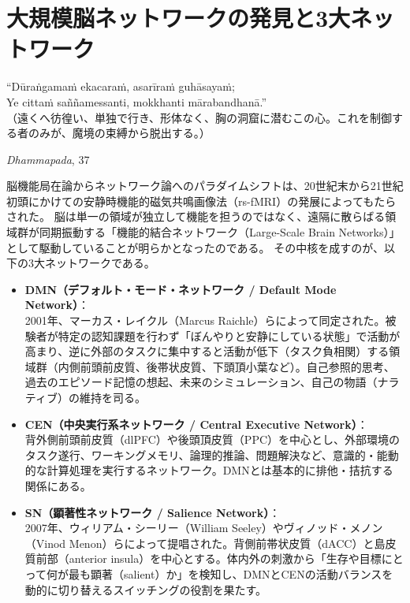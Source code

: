 \chapter{大規模脳ネットワークの発見と3大ネットワーク}
\epigraph{``Dūraṅgamaṁ ekacaraṁ, asarīraṁ guhāsayaṁ;\\
Ye cittaṁ saññamessanti, mokkhanti mārabandhanā.''\\
\small（遠くへ彷徨い、単独で行き、形体なく、胸の洞窟に潜むこの心。これを制御する者のみが、魔境の束縛から脱出する。）}{\textit{Dhammapada}, 37}

脳機能局在論からネットワーク論へのパラダイムシフトは、20世紀末から21世紀初頭にかけての安静時機能的磁気共鳴画像法（rs-fMRI）の発展によってもたらされた。
脳は単一の領域が独立して機能を担うのではなく、遠隔に散らばる領域群が同期振動する「機能的結合ネットワーク（Large-Scale Brain Networks）」として駆動していることが明らかとなったのである。
その中核を成すのが、以下の3大ネットワークである。

\begin{itemize}
  \item \textbf{DMN（デフォルト・モード・ネットワーク / Default Mode Network）}：\\
  2001年、マーカス・レイクル（Marcus Raichle）らによって同定された。被験者が特定の認知課題を行わず「ぼんやりと安静にしている状態」で活動が高まり、逆に外部のタスクに集中すると活動が低下（タスク負相関）する領域群（内側前頭前皮質、後帯状皮質、下頭頂小葉など）。自己参照的思考、過去のエピソード記憶の想起、未来のシミュレーション、自己の物語（ナラティブ）の維持を司る。
  \item \textbf{CEN（中央実行系ネットワーク / Central Executive Network）}：\\
  背外側前頭前皮質（dlPFC）や後頭頂皮質（PPC）を中心とし、外部環境のタスク遂行、ワーキングメモリ、論理的推論、問題解決など、意識的・能動的な計算処理を実行するネットワーク。DMNとは基本的に排他・拮抗する関係にある。
  \item \textbf{SN（顕著性ネットワーク / Salience Network）}：\\
  2007年、ウィリアム・シーリー（William Seeley）やヴィノッド・メノン（Vinod Menon）らによって提唱された。背側前帯状皮質（dACC）と島皮質前部（anterior insula）を中心とする。体内外の刺激から「生存や目標にとって何が最も顕著（salient）か」を検知し、DMNとCENの活動バランスを動的に切り替えるスイッチングの役割を果たす。
\end{itemize}

